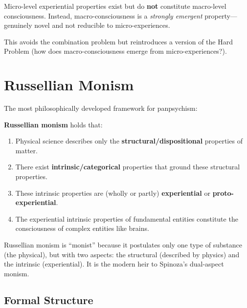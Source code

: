 \documentclass[11pt,a4paper]{report}
\begin{document}
\begin{varbox}
Micro-level experiential properties exist but do \textbf{not} constitute macro-level consciousness. Instead, macro-consciousness is a \emph{strongly emergent} property---genuinely novel and not reducible to micro-experiences.

This avoids the combination problem but reintroduces a version of the Hard Problem (how does macro-consciousness emerge from micro-experiences?).
\end{varbox}

\section{Russellian Monism}

The most philosophically developed framework for panpsychism:

\begin{principlebox}
\textbf{Russellian monism} holds that:
\begin{enumerate}[leftmargin=1.5em]
  \item Physical science describes only the \textbf{structural/dispositional} properties of matter.
  \item There exist \textbf{intrinsic/categorical} properties that ground these structural properties.
  \item These intrinsic properties are (wholly or partly) \textbf{experiential} or \textbf{proto-experiential}.
  \item The experiential intrinsic properties of fundamental entities constitute the consciousness of complex entities like brains.
\end{enumerate}
Russellian monism is ``monist'' because it postulates only one type of substance (the physical), but with two aspects: the structural (described by physics) and the intrinsic (experiential). It is the modern heir to Spinoza's dual-aspect monism.
\end{principlebox}

\subsection{Formal Structure}
\end{document}
